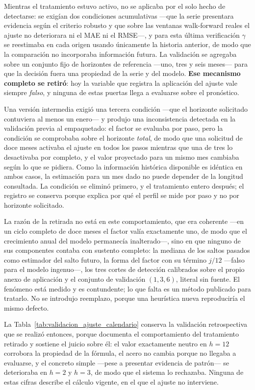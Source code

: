 \documentclass[12pt,letterpaper]{article}
\begin{document}
Mientras el tratamiento estuvo activo, no se aplicaba por el solo hecho de detectarse: se exigían dos condiciones acumulativas ---que la serie presentara evidencia según el criterio robusto y que sobre las ventanas walk-forward reales el ajuste no deteriorara ni el MAE ni el RMSE---, y para esta última verificación \(\gamma\) se reestimaba en cada origen usando únicamente la historia anterior, de modo que la comparación no incorporaba información futura. La validación se agregaba sobre un conjunto fijo de horizontes de referencia ---uno, tres y seis meses--- para que la decisión fuera una propiedad de la serie y del modelo. \textbf{Ese mecanismo completo se retiró}: hoy la variable que registra la aplicación del ajuste vale siempre \emph{falso}, y ninguna de estas puertas llega a evaluarse sobre el pronóstico.

Una versión intermedia exigió una tercera condición ---que el horizonte solicitado contuviera al menos un enero--- y produjo una inconsistencia detectada en la validación previa al empaquetado: el factor se evaluaba por paso, pero la condición se comprobaba sobre el horizonte \emph{total}, de modo que una solicitud de doce meses activaba el ajuste en todos los pasos mientras que una de tres lo desactivaba por completo, y el valor proyectado para un mismo mes cambiaba según lo que se pidiera. Como la información histórica disponible es idéntica en ambos casos, la estimación para un mes dado no puede depender de la longitud consultada. La condición se eliminó primero, y el tratamiento entero después; el registro se conserva porque explica por qué el perfil se mide por paso y no por horizonte solicitado.

La razón de la retirada no está en este comportamiento, que era coherente ---en un ciclo completo de doce meses el factor valía exactamente uno, de modo que el crecimiento anual del modelo permanecía inalterado---, sino en que ninguno de sus componentes contaba con sustento completo: la mediana de los saltos pasados como estimador del salto futuro, la forma del factor con su término \(j/12\) ---falso para el modelo ingenuo---, los tres cortes de detección calibrados sobre el propio anexo de aplicación y el conjunto de validación \((1,3,6)\), literal sin fuente. El fenómeno está medido y es contundente; lo que falta es un método publicado para tratarlo. No se introdujo reemplazo, porque una heurística nueva reproduciría el mismo defecto.

La Tabla~\ref{tab:validacion_ajuste_calendario} conserva la validación retrospectiva que se realizó entonces, porque documenta el comportamiento del tratamiento retirado y sostiene el juicio sobre él: el valor exactamente neutro en \(h=12\) corrobora la propiedad de la fórmula, el acero no cambia porque no llegaba a evaluarse, y el concreto simple ---pese a presentar evidencia de patrón--- se deterioraba en \(h=2\) y \(h=3\), de modo que el sistema lo rechazaba. Ninguna de estas cifras describe el cálculo vigente, en el que el ajuste no interviene.
\end{document}
